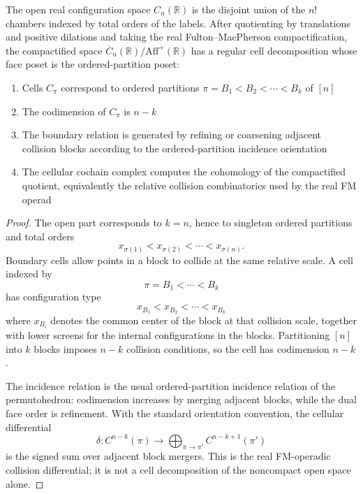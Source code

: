 \begin{theorem}
\label{thm:permutohedral-cell-complex}
The open real configuration space $C_n(\mathbb R)$ is the disjoint union
of the $n!$ chambers indexed by total orders of the labels. After
quotienting by translations and positive dilations and taking the real
Fulton--MacPherson compactification, the compactified space
$\overline C_n(\mathbb R)/\mathrm{Aff}^+(\mathbb R)$ has a regular cell
decomposition whose face poset is the ordered-partition poset:
\begin{enumerate}
\item Cells $C_\pi$ correspond to ordered partitions $\pi = B_1 < B_2 < \cdots < B_k$ of $[n]$
\item The codimension of $C_\pi$ is $n-k$
\item The boundary relation is generated by refining or coarsening
adjacent collision blocks according to the ordered-partition incidence
orientation
\item The cellular cochain complex computes the cohomology of the
compactified quotient, equivalently the relative collision combinatorics
used by the real FM operad
\end{enumerate}
\end{theorem}
\begin{proof}
The open part corresponds to $k=n$, hence to singleton ordered
partitions and total orders
\[
x_{\sigma(1)}<x_{\sigma(2)}<\cdots<x_{\sigma(n)}.
\]
Boundary cells allow points in a block to collide at the same relative
scale. A cell indexed by
\[
\pi=B_1<\cdots<B_k
\]
has configuration type
\[
x_{B_1} < x_{B_2} < \cdots < x_{B_k}
\]
where $x_{B_i}$ denotes the common center of the block at that collision
scale, together with lower screens for the internal configurations in
the blocks. Partitioning $[n]$ into $k$ blocks imposes $n-k$ collision
conditions, so the cell has codimension $n-k$.

The incidence relation is the usual ordered-partition incidence
relation of the permutohedron: codimension increases by merging adjacent
blocks, while the dual face order is refinement. With the standard
orientation convention, the cellular differential
\[
\delta: C^{n-k}(\pi) \to \bigoplus_{\pi \to \pi'} C^{n-k+1}(\pi')
\]
is the signed sum over adjacent block mergers. This is the real
FM-operadic collision differential; it is not a cell decomposition of
the noncompact open space alone.
\end{proof}

